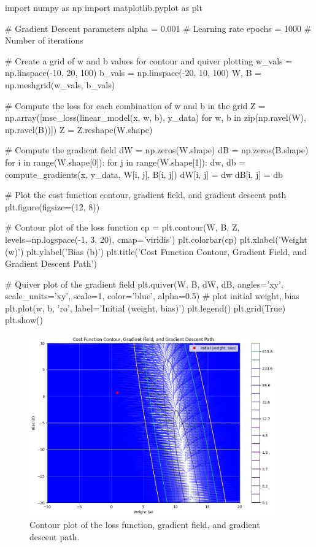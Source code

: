 \begin{codeblock}
import numpy as np
import matplotlib.pyplot as plt

# Gradient Descent parameters
alpha = 0.001  # Learning rate
epochs = 1000  # Number of iterations

# Create a grid of w and b values for contour and quiver plotting
w_vals = np.linspace(-10, 20, 100)
b_vals = np.linspace(-20, 10, 100)
W, B = np.meshgrid(w_vals, b_vals)

# Compute the loss for each combination of w and b in the grid
Z = np.array([mse_loss(linear_model(x, w, b), y_data) for w, b in zip(np.ravel(W), np.ravel(B))])
Z = Z.reshape(W.shape)

# Compute the gradient field
dW = np.zeros(W.shape)
dB = np.zeros(B.shape)
for i in range(W.shape[0]):
    for j in range(W.shape[1]):
        dw, db = compute_gradients(x, y_data, W[i, j], B[i, j])
        dW[i, j] = dw
        dB[i, j] = db

# Plot the cost function contour, gradient field, and gradient descent path
plt.figure(figsize=(12, 8))

# Contour plot of the loss function
cp = plt.contour(W, B, Z, levels=np.logspace(-1, 3, 20), cmap='viridis')
plt.colorbar(cp)
plt.xlabel('Weight (w)')
plt.ylabel('Bias (b)')
plt.title('Cost Function Contour, Gradient Field, and Gradient Descent Path')

# Quiver plot of the gradient field
plt.quiver(W, B, dW, dB, angles='xy', scale_units='xy', scale=1, color='blue', alpha=0.5)
# plot initial weight, bias
plt.plot(w, b, 'ro', label='Initial (weight, bias)')
plt.legend()
plt.grid(True)
plt.show()
\end{codeblock}

\begin{figure}
\centering
\includegraphics[width=300pt]{Regression/img/output_12_0.png}
\caption{Contour plot of the loss function, gradient field, and gradient descent path.}
\label{fig:linear3}
\end{figure}

